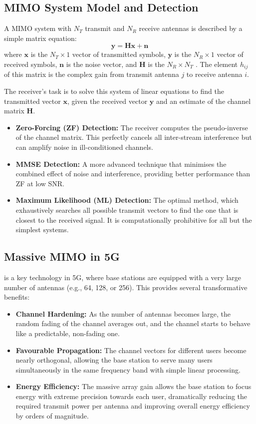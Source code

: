 \subsection{MIMO System Model and Detection}

A MIMO system with $N_T$ transmit and $N_R$ receive antennas is described by a simple matrix equation:
\begin{equation}
    \mathbf{y} = \mathbf{H}\mathbf{x} + \mathbf{n}
\end{equation}
where $\mathbf{x}$ is the $N_T \times 1$ vector of transmitted symbols, $\mathbf{y}$ is the $N_R \times 1$ vector of received symbols, $\mathbf{n}$ is the noise vector, and $\mathbf{H}$ is the $N_R \times N_T$ . The element $h_{ij}$ of this matrix is the complex gain from transmit antenna $j$ to receive antenna $i$.

The receiver's task is to solve this system of linear equations to find the transmitted vector $\mathbf{x}$, given the received vector $\mathbf{y}$ and an estimate of the channel matrix $\mathbf{H}$.
\begin{itemize}
    \item \textbf{Zero-Forcing (ZF) Detection:} The receiver computes the pseudo-inverse of the channel matrix. This perfectly cancels all inter-stream interference but can amplify noise in ill-conditioned channels.
    \item \textbf{MMSE Detection:} A more advanced technique that minimises the combined effect of noise and interference, providing better performance than ZF at low SNR.
    \item \textbf{Maximum Likelihood (ML) Detection:} The optimal method, which exhaustively searches all possible transmit vectors to find the one that is closest to the received signal. It is computationally prohibitive for all but the simplest systems.
\end{itemize}


\subsection{Massive MIMO in 5G}

 is a key technology in 5G, where base stations are equipped with a very large number of antennas (e.g., 64, 128, or 256). This provides several transformative benefits:
\begin{itemize}
    \item \textbf{Channel Hardening:} As the number of antennas becomes large, the random fading of the channel averages out, and the channel starts to behave like a predictable, non-fading one.
    \item \textbf{Favourable Propagation:} The channel vectors for different users become nearly orthogonal, allowing the base station to serve many users simultaneously in the same frequency band with simple linear processing.
    \item \textbf{Energy Efficiency:} The massive array gain allows the base station to focus energy with extreme precision towards each user, dramatically reducing the required transmit power per antenna and improving overall energy efficiency by orders of magnitude.
\end{itemize}


